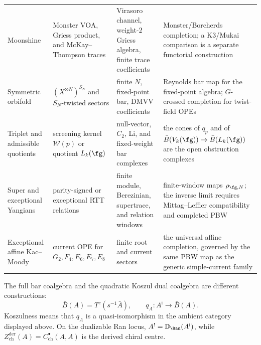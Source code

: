 {\begin{longtable}{@{}p{}p{}p{}p{}@{}}
Moonshine &
Monster VOA, Griess product, and McKay--Thompson traces &
Virasoro channel, weight-\(2\) Griess algebra, finite trace
coefficients &
Monster/Borcherds completion; a K3/Mukai comparison is a separate
functorial construction \\

Symmetric orbifold &
\((X^{\otimes N})^{S_N}\) and \(S_N\)-twisted sectors &
finite \(N\), fixed-point bar, DMVV coefficients &
Reynolds bar map for the fixed-point algebra; \(G\)-crossed
completion for twist-field OPEs \\

Triplet and admissible quotients &
screening kernel \(\mathcal W(p)\) or quotient \(L_k(\fg)\) &
null-vector, \(C_2\), Li, and fixed-weight bar complexes &
the cones of \(q_p\) and of
\(\bar B(V_k(\fg))\to\bar B(L_k(\fg))\) are the open obstruction
complexes \\

Super and exceptional Yangians &
parity-signed or exceptional RTT relations &
finite module, Berezinian, supertrace, and relation windows &
finite-window maps \(\rho_{\fg,N}\); the inverse limit requires
Mittag--Leffler compatibility and completed PBW \\

Exceptional affine Kac--Moody &
current OPE for \(G_2,F_4,E_6,E_7,E_8\) &
finite root and current sectors &
the universal affine completion, governed by the same PBW map as the
generic simple-current family \\
\bottomrule
\end{longtable}
}

The full bar coalgebra and the quadratic Koszul dual coalgebra are
different constructions:
\[
\bar B(A)=T^c(s^{-1}\bar A),\qquad
q_A:A^{\mathrm i}\longrightarrow\bar B(A).
\]
Koszulness means that \(q_A\) is a quasi-isomorphism in the ambient
category displayed above.  On the dualizable Ran locus,
\(A^!=\mathbb D_{\Ran}(A^{\mathrm i})\), while
\(Z_{\mathrm{ch}}^{\mathrm{der}}(A)
=C^\bullet_{\mathrm{ch}}(A,A)\) is the derived chiral centre.

